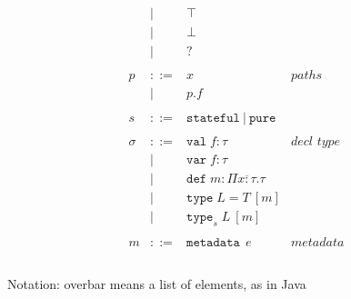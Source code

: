 \documentclass{article}
\newcommand{\keywadj}[1]{\mathtt{#1}}
\newcommand{\keyw}[1]{\keywadj{#1}~}
\begin{document}
\[\begin{array}{lll}
\begin{array}{lllr}
     & |   & \top                                                  &\\
     & |   & \bot                                                  &\\
     & |   & ?                                                     &\\
&&\\
p & ::= & x   & paths \\
  & |   & p.f &\\
&&\\
s & ::= & \keyw{stateful} | ~\keyw{pure} \\
&&\\
\sigma & ::= & \texttt{val} \; f:\tau                           & \textit{decl type}\\
       & |   & \texttt{var} \; f:\tau                           &\\
       & |   & \texttt{def} \; m:\Pi \overline{x{:}\tau} . \tau &\\
       & |   & \texttt{type} \; L = T ~[m]                      &\\
       & |   & \texttt{type}_{s} \; L ~[m]                      &\\
&&\\
m & ::= & \keyw{metadata} ~e & metadata \\
&&\\
\end{array}
\end{array}
\]

Notation: overbar means a list of elements, as in Java
\end{document}
